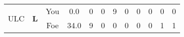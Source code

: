 \documentclass[a4paper,12pt]{article}
\begin{document}
\begin{tabular}[t]{| c | c | c | c | c | c | c | c | c | c | c | c
      |}
        \hline
        \multirow{2}{*}{  ULC  } &
              \multirow{2}{*}{  \textbf{L}  } & 
                    \cellcolor{yellow!25} You & \cellcolor{yellow!25} 0.0 & \cellcolor{yellow!25} 0 &
                    \cellcolor{yellow!25} 0 & \cellcolor{yellow!25} 9 & \cellcolor{yellow!25} 0 &
                    \cellcolor{yellow!25} 0 & \cellcolor{yellow!25} 0 & \cellcolor{yellow!25} 0 &
                    \cellcolor{yellow!25} 0 \\
                    \cline{3-12}
                    & & \cellcolor{red!15} Foe & \cellcolor{red!15} 34.0 & \cellcolor{red!15} 9 & \cellcolor{red!15}
                    0 & \cellcolor{red!15} 0
                    & \cellcolor{red!15} 0 & \cellcolor{red!15}
                    0 & \cellcolor{red!15} 0 
                    & \cellcolor{red!15} 1 & \cellcolor{red!15}
                    1 \\
                    
                      
      
                      
      
                      
      
                      
                        \hline
                      \end{tabular}
                      
                    
\end{document}
